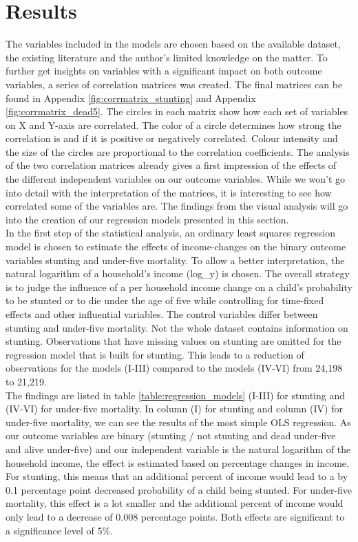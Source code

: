 \documentclass[a4paper, 11pt]{article} %
\begin{document}
\section{Results}
The variables included in the models are chosen based on the available dataset, the existing literature and the author's limited knowledge on the matter. To further get insights on variables with a significant impact on both outcome variables, a series of correlation matrices was created. The final matrices can be found in Appendix \ref{fig:corrmatrix_stunting} and Appendix \ref{fig:corrmatrix_dead5}. The circles in each matrix show how each set of variables on X and Y-axis are correlated. The color of a circle determines how strong the correlation is and if it is positive or negatively correlated. Colour intensity and the size of the circles are proportional to the correlation coefficients. The analysis of the two correlation matrices already gives a first impression of the effects of the different independent variables on our outcome variables. While we won't go into detail with the interpretation of the matrices, it is interesting to see how correlated some of the variables are. The findings from the visual analysis will go into the creation of our regression models presented in this section. \\

In the first step of the statistical analysis, an ordinary least squares regression model is chosen to estimate the effects of income-changes on the binary outcome variables stunting and under-five mortality. To allow a better interpretation, the natural logarithm of a household's income (log\_y) is chosen. The overall strategy is to judge the influence of a per household income change on a child's probability to be stunted or to die under the age of five while controlling for time-fixed effects and other influential variables. The control variables differ between stunting and under-five mortality. Not the whole dataset contains information on stunting. Observations that have missing values on stunting are omitted for the regression model that is built for stunting. This leads to a reduction of observations for the models (I-III) compared to the models (IV-VI) from 24,198 to 21,219. \\

The findings are listed in table \ref{table:regression_models} (I-III) for stunting and (IV-VI) for under-five mortality. In column (I) for stunting and column (IV) for under-five mortality, we can see the results of the most simple OLS regression. As our outcome variables are binary (stunting / not stunting and dead under-five and alive under-five) and our independent variable is the natural logarithm of the household income, the effect is estimated based on percentage changes in income. For stunting, this means that an additional percent of income would lead to a by 0.1 percentage point decreased probability of a child being stunted. For under-five mortality, this effect is a lot smaller and the additional percent of income would only lead to a decrease of 0.008 percentage points. Both effects are significant to a significance level of 5\%. \\
\end{document}
